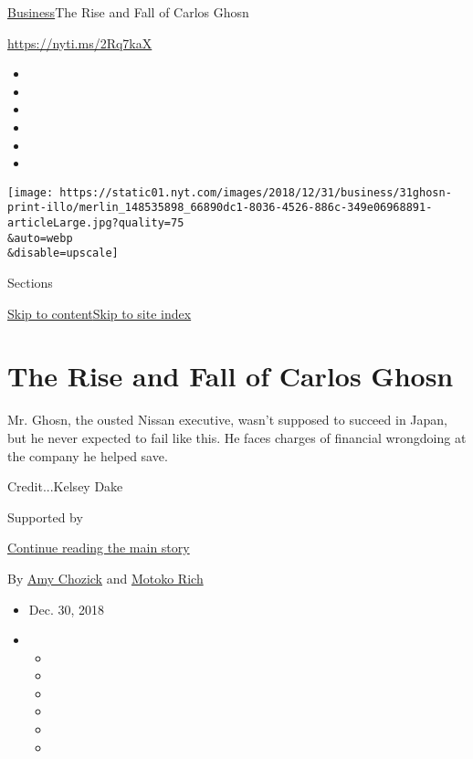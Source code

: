 \href{/section/business}{Business}\textbar{}The Rise and Fall of Carlos
Ghosn

\url{https://nyti.ms/2Rq7kaX}

\begin{itemize}
\item
\item
\item
\item
\item
\item
\end{itemize}

\texttt{[image: https://static01.nyt.com/images/2018/12/31/business/31ghosn-print-illo/merlin\_148535898\_66890dc1-8036-4526-886c-349e06968891-articleLarge.jpg?quality=75\\\&auto=webp\\\&disable=upscale]}

Sections

\protect\hyperlink{site-content}{Skip to
content}\protect\hyperlink{site-index}{Skip to site index}

\hypertarget{the-rise-and-fall-of-carlos-ghosn}{%
\section{The Rise and Fall of Carlos
Ghosn}\label{the-rise-and-fall-of-carlos-ghosn}}

Mr. Ghosn, the ousted Nissan executive, wasn't supposed to succeed in
Japan, but he never expected to fail like this. He faces charges of
financial wrongdoing at the company he helped save.

Credit...Kelsey Dake

Supported by

\protect\hyperlink{after-sponsor}{Continue reading the main story}

By \href{https://www.nytimes.com/by/amy-chozick}{Amy Chozick} and
\href{https://www.nytimes.com/by/motoko-rich}{Motoko Rich}

\begin{itemize}
\item
  Dec. 30, 2018
\item
  \begin{itemize}
  \item
  \item
  \item
  \item
  \item
  \item
  \end{itemize}
\end{itemize}

